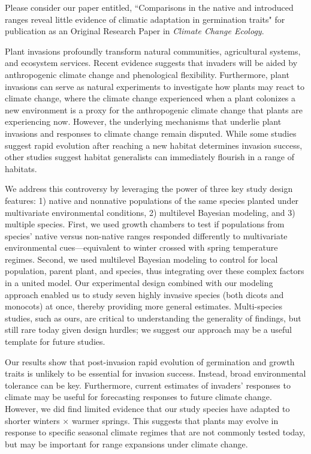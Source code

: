 \documentclass[11pt]{article}
\begin{document}
	\medskip
	Please consider our paper entitled, ``Comparisons in the native and introduced ranges reveal little evidence of climatic adaptation in germination traits" for publication as an Original Research Paper in \textit{Climate Change Ecology}. \par
	Plant invasions profoundly transform natural communities, agricultural systems, and ecosystem services. Recent evidence suggests that invaders will be aided by anthropogenic climate change and phenological flexibility. Furthermore, plant invasions can serve as natural experiments to investigate how plants may react to climate change, where the climate change experienced when a plant colonizes a new environment is a proxy for the anthropogenic climate change that plants are experiencing now. However, the underlying mechanisms that underlie plant invasions and responses to climate change remain disputed. While some studies suggest rapid evolution after reaching a new habitat determines invasion success, other studies suggest habitat generalists can immediately flourish in a range of habitats.\par 
	We address this controversy by leveraging the power of three key study design features: 1) native and nonnative populations of the same species planted under multivariate environmental conditions, 2) multilevel Bayesian modeling, and 3) multiple species. First, we used growth chambers to test if populations from species' native versus non-native ranges responded differently to multivariate environmental cues---equivalent to winter crossed with spring temperature regimes. Second, we used multilevel Bayesian modeling to control for local population, parent plant, and species, thus integrating over these complex factors in a united model. Our experimental design combined with our modeling approach enabled us to study seven highly invasive species (both dicots and monocots) at once, thereby providing more general estimates. Multi-species studies, such as ours, are critical to understanding the generality of findings, but still rare today given design hurdles; we suggest our approach may be a useful template for future studies.  \par %
	Our results show that post-invasion rapid evolution of germination and growth traits is unlikely to be essential for invasion success. Instead, broad environmental tolerance can be key. Furthermore, current estimates of invaders' responses to climate may be useful for forecasting responses to future climate change. However, we did find limited evidence that our study species have adapted to shorter winters $\times$ warmer springs. This suggests that plants may evolve in response to specific seasonal climate regimes that are not commonly tested today, but may be important for range expansions under climate change. 
\end{document}
